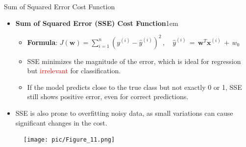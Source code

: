 \documentclass[serif, aspectratio=169]{beamer}
\begin{document}
    \begin{frame}{Sum of Squared Error Cost Function}
        \begin{itemize}
            \item \textbf{Sum of Squared Error (SSE) Cost Function}\itemsep1em
            \medskip
            \begin{itemize}\itemsep0.8em
            \item \textbf{Formula}:
            \(
            J(\mathbf{w}) = \sum_{i=1}^{n} (y^{(i)} - \hat{y}^{(i)})^2 \, , \quad \hat{y}^{(i)} \, = \, \mathbf{w}^T\mathbf{x}^{(i)} \, + \, w_0
            \)
            \item \justifying SSE minimizes the magnitude of the error, which is ideal for regression but \textcolor{red}{irrelevant} for classification.
            \item \justifying If the model predicts close to the true class but not exactly 0 or 1, SSE still shows positive error, even for correct predictions.
            \end{itemize}
        \end{itemize}
        \begin{itemize}
            \item SSE is also prone to overfitting noisy data, as small variations can cause significant changes in the cost.
        \end{itemize}
        \endminipage
        \begin{figure}
            \centering
            \texttt{[image: pic/Figure\_11.png]}
        \end{figure}
        \endminipage
        \vfill
    \end{frame}
\end{document}
